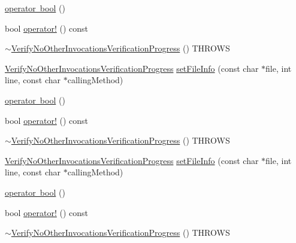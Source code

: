 \begin{DoxyCompactItemize}
\item 
\mbox{\hyperlink{classfakeit_1_1VerifyNoOtherInvocationsVerificationProgress_a0c43a3d8783d9dae9d963190a6a41b47}{operator bool}} ()
\item 
bool \mbox{\hyperlink{classfakeit_1_1VerifyNoOtherInvocationsVerificationProgress_a61e25bc85da74b9eceae47fcca1dec4f}{operator!}} () const
\item 
\mbox{\hyperlink{classfakeit_1_1VerifyNoOtherInvocationsVerificationProgress_a772030e95159eefd02781fb3ea7724cd}{$\sim$\+Verify\+No\+Other\+Invocations\+Verification\+Progress}} () T\+H\+R\+O\+WS
\item 
\mbox{\hyperlink{classfakeit_1_1VerifyNoOtherInvocationsVerificationProgress}{Verify\+No\+Other\+Invocations\+Verification\+Progress}} \mbox{\hyperlink{classfakeit_1_1VerifyNoOtherInvocationsVerificationProgress_a7f7eed982a12383ca4254831cf4d223b}{set\+File\+Info}} (const char $\ast$file, int line, const char $\ast$calling\+Method)
\item 
\mbox{\hyperlink{classfakeit_1_1VerifyNoOtherInvocationsVerificationProgress_a0c43a3d8783d9dae9d963190a6a41b47}{operator bool}} ()
\item 
bool \mbox{\hyperlink{classfakeit_1_1VerifyNoOtherInvocationsVerificationProgress_a61e25bc85da74b9eceae47fcca1dec4f}{operator!}} () const
\item 
\mbox{\hyperlink{classfakeit_1_1VerifyNoOtherInvocationsVerificationProgress_a772030e95159eefd02781fb3ea7724cd}{$\sim$\+Verify\+No\+Other\+Invocations\+Verification\+Progress}} () T\+H\+R\+O\+WS
\item 
\mbox{\hyperlink{classfakeit_1_1VerifyNoOtherInvocationsVerificationProgress}{Verify\+No\+Other\+Invocations\+Verification\+Progress}} \mbox{\hyperlink{classfakeit_1_1VerifyNoOtherInvocationsVerificationProgress_a7f7eed982a12383ca4254831cf4d223b}{set\+File\+Info}} (const char $\ast$file, int line, const char $\ast$calling\+Method)
\item 
\mbox{\hyperlink{classfakeit_1_1VerifyNoOtherInvocationsVerificationProgress_a0c43a3d8783d9dae9d963190a6a41b47}{operator bool}} ()
\item 
bool \mbox{\hyperlink{classfakeit_1_1VerifyNoOtherInvocationsVerificationProgress_a61e25bc85da74b9eceae47fcca1dec4f}{operator!}} () const
\item 
\mbox{\hyperlink{classfakeit_1_1VerifyNoOtherInvocationsVerificationProgress_a772030e95159eefd02781fb3ea7724cd}{$\sim$\+Verify\+No\+Other\+Invocations\+Verification\+Progress}} () T\+H\+R\+O\+WS
\item 

\end{DoxyCompactItemize}

